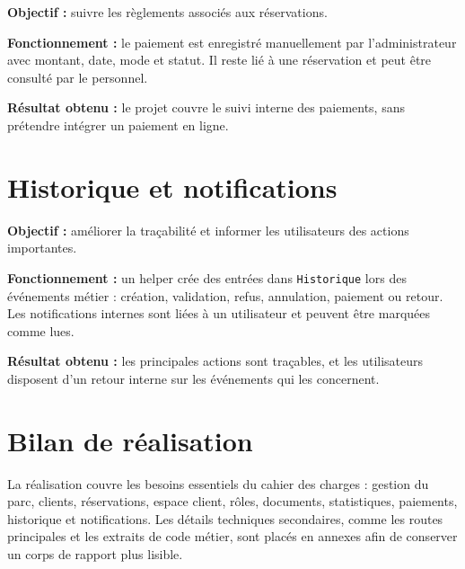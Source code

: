 \textbf{Objectif :} suivre les règlements associés aux réservations.

\textbf{Fonctionnement :} le paiement est enregistré manuellement par l'administrateur avec montant, date, mode et statut. Il reste lié à une réservation et peut être consulté par le personnel.

\textbf{Résultat obtenu :} le projet couvre le suivi interne des paiements, sans prétendre intégrer un paiement en ligne.

\section{Historique et notifications}

\textbf{Objectif :} améliorer la traçabilité et informer les utilisateurs des actions importantes.

\textbf{Fonctionnement :} un helper crée des entrées dans \texttt{Historique} lors des événements métier : création, validation, refus, annulation, paiement ou retour. Les notifications internes sont liées à un utilisateur et peuvent être marquées comme lues.

\textbf{Résultat obtenu :} les principales actions sont traçables, et les utilisateurs disposent d'un retour interne sur les événements qui les concernent.

\section{Bilan de réalisation}

La réalisation couvre les besoins essentiels du cahier des charges : gestion du parc, clients, réservations, espace client, rôles, documents, statistiques, paiements, historique et notifications. Les détails techniques secondaires, comme les routes principales et les extraits de code métier, sont placés en annexes afin de conserver un corps de rapport plus lisible.
